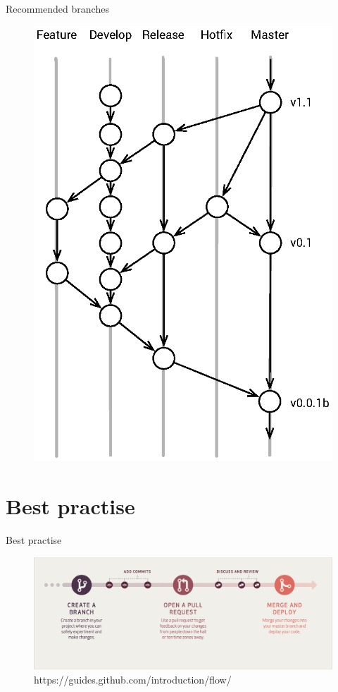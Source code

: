 \documentclass{beamer}
\begin{document}
\begin{frame}{Recommended branches}
    \begin{figure}
        \center
        \includegraphics[height=.8\textheight]{git-recommended-branches}
        \label{fig:git-recommanded-branches}
    \end{figure}
\end{frame}

\section{Best practise}
\begin{frame}{Best practise}
    \begin{figure}
        \center
        \includegraphics[width=.9\textwidth]{git-workflow}
        \caption{https://guides.github.com/introduction/flow/}
        \label{fig:git-workflow}
    \end{figure}
\end{frame}
\end{document}
